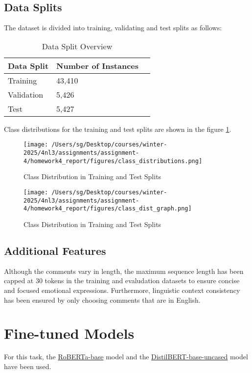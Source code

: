 \documentclass[titlepage]{article}
\begin{document}
\subsection{Data Splits}
The dataset is divided into training, validating and test splits as follows:

\begin{table}[H] \label{tab:data_split}
    \centering
    \begin{tabular}{lll}
    \toprule
    \textbf{Data Split} & \textbf{Number of Instances} \\
    \midrule
    Training & 43,410 \\
    Validation & 5,426 \\
    Test & 5,427 \\
    \bottomrule
    \end{tabular}
    \caption{Data Split Overview}
\end{table}

Class distributions for the training and test splits are shown in the figure \ref{fig:class_distribution}.

\begin{figure}[H] \label{fig:class_distribution}
    \centering
    \texttt{[image: /Users/sg/Desktop/courses/winter-2025/4nl3/assignments/assignment-4/homework4\_report/figures/class\_distributions.png]}
    \caption{Class Distribution in Training and Test Splits}
\end{figure}

\begin{figure}[H] \label{fig:class_dist_graph}
    \centering
    \texttt{[image: /Users/sg/Desktop/courses/winter-2025/4nl3/assignments/assignment-4/homework4\_report/figures/class\_dist\_graph.png]}
    \caption{Class Distribution in Training and Test Splits}
\end{figure}

\subsection{Additional Features}
Although the comments vary in length, the maximum sequence length has been capped at 30 tokens in the training and evaludation datasets 
to ensure concise and focused emotional expressions. Furthermore, linguistic context consistency has been ensured by only choosing comments 
that are in English.
 
\section{Fine-tuned Models}
For this task, the \href{https://huggingface.co/FacebookAI/roberta-base}{RoBERTa-base} model and the \href{https://huggingface.co/distilbert/distilbert-base-uncased}
{DistilBERT-base-uncased} model have been used. 
\end{document}
